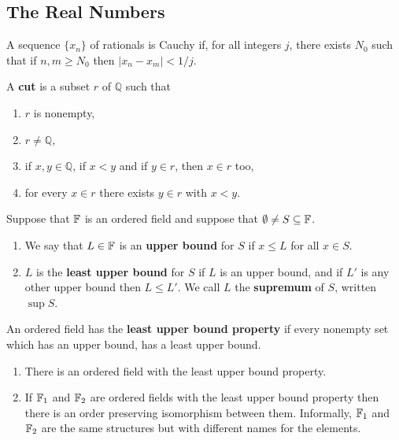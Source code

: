\subsection{The Real Numbers}
\begin{definition}
    A sequence \(\{x_n\}\) of rationals is Cauchy if, for all integers \(j\), there exists \(N_0\) such that if \(n, m \geq N_0\) then \(|x_n - x_m| < 1/j\).
\end{definition}

\begin{definition}
    A \textbf{cut} is a subset \(r\) of \(\mathbb{Q}\) such that
    \begin{enumerate}
        \item \(r\) is nonempty,
        \item \(r \neq \mathbb{Q}\),
        \item if \(x, y \in \mathbb{Q}\), if \(x < y\) and if \(y \in r\), then \(x \in r\) too,
        \item for every \(x \in r\) there exists \(y \in r\) with \(x < y\).
    \end{enumerate}
\end{definition}

\begin{definition}
    Suppose that \(\mathbb{F}\) is an ordered field and suppose that \(\emptyset \neq S \subseteq \mathbb{F}\).
    \begin{enumerate}
        \item We say that \(L \in \mathbb{F}\) is an \textbf{upper bound} for \(S\) if \(x \leq L\) for all \(x \in S\).
        \item \(L\) is the \textbf{least upper bound} for \(S\) if \(L\) is an upper bound, and if \(L'\) is any other upper bound then \(L \leq L'\). We call \(L\) the \textbf{supremum} of \(S\), written \(\sup S\).
    \end{enumerate}
\end{definition}

\begin{definition}
    An ordered field has the \textbf{least upper bound property} if every nonempty set which has an upper bound, has a least upper bound.
\end{definition}

\begin{theorem}
    \begin{enumerate}
        \item There is an ordered field with the least upper bound property.
        \item If \(\mathbb{F}_1\) and \(\mathbb{F}_2\) are ordered fields with the least upper bound property then there is an order preserving isomorphism between them. Informally, \(\mathbb{F}_1\) and \(\mathbb{F}_2\) are the same structures but with different names for the elements.
    \end{enumerate}
\end{theorem}

\pagebreak